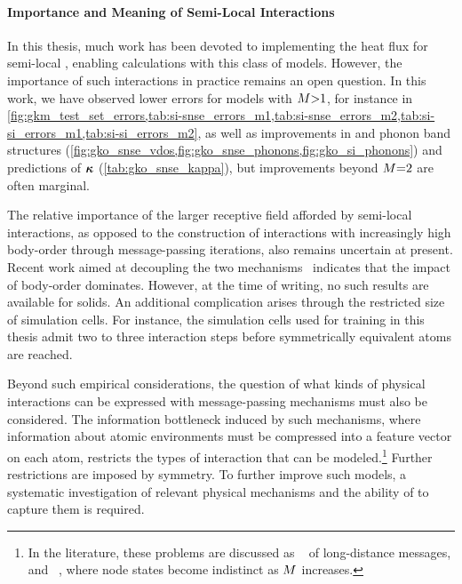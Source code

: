 \paragraph{Importance and Meaning of Semi-Local Interactions}
In this thesis, much work has been devoted to implementing the heat flux for semi-local \glps, enabling \gk calculations with this class of models.
However, the importance of such interactions in practice remains an open question.
In this work, we have observed lower errors for models with $M{>}1$, for instance in \cref{fig:gkm_test_set_errors,tab:si-snse_errors_m1,tab:si-snse_errors_m2,tab:si-si_errors_m1,tab:si-si_errors_m2}, as well as improvements in \vdos and phonon band structures (\cref{fig:gko_snse_vdos,fig:gko_snse_phonons,fig:gko_si_phonons}) and predictions of $\boldsymbol{\kappa}$ (\cref{tab:gko_snse_kappa}), but improvements beyond $M{=}2$ are often marginal.

The relative importance of the larger receptive field afforded by semi-local interactions, as opposed to the construction of interactions with increasingly high body-order through message-passing iterations, also remains uncertain at present.
Recent work aimed at decoupling the two mechanisms~\cite{bkoc2022q} indicates that the impact of body-order dominates.
However, at the time of writing, no such results are available for solids.
An additional complication arises through the restricted size of simulation cells. For instance, the simulation cells used for training in this thesis admit two to three interaction steps before symmetrically equivalent atoms are reached.

Beyond such empirical considerations, the question of what kinds of physical interactions can be expressed with message-passing mechanisms must also be considered.
The information bottleneck induced by such mechanisms, where information about atomic environments must be compressed into a feature vector on each atom, restricts the types of interaction that can be modeled.\footnote{In the \ml literature, these problems are discussed as ~\cite{tddb2021a} of long-distance messages, and ~\cite{lhw2018a,cw2020a}, where node states become indistinct as $M$ increases.}
Further restrictions are imposed by symmetry.
To further improve such models, a systematic investigation of relevant physical mechanisms and the ability of \mpnns to capture them is required.


